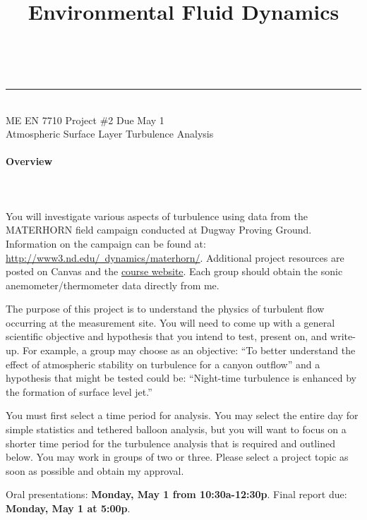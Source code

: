 \documentclass[11pt]{article}
\makeatletter
\newcommand{\linia}{\rule{\linewidth}{0.5pt}}
\renewcommand{\maketitle}{
\begin{center}
\vspace{2ex}
{\huge \textsc{\@title}}
\vspace{1ex}
\\
\linia\\
ME EN 7710 \hfill Project \#2 \hfill Due May 1\\
Atmospheric Surface Layer Turbulence Analysis
\vspace{4ex}
\end{center}
}
\makeatother
\begin{document}

\title{Environmental Fluid Dynamics}

\maketitle
\vspace{-20pt}
\paragraph{\large Overview}~\\~\\
You will investigate various aspects of turbulence using data from the MATERHORN field campaign conducted at Dugway Proving Ground. Information on the campaign can be found at: \href{http://www3.nd.edu/~dynamics/materhorn/}{http://www3.nd.edu/~dynamics/materhorn/}. Additional project resources are posted on Canvas and the \href{http://gibbs.science/efd}{course website}. Each group should obtain the sonic anemometer/thermometer data directly from me.

 The purpose of this project is to understand the physics of turbulent flow occurring at the measurement site. You will need to come up with a general scientific objective and hypothesis that you intend to test, present on, and write-up. For example, a group may choose as an objective: ``To better understand the effect of atmospheric stability on turbulence for a canyon outflow'' and a hypothesis that might be tested could be: ``Night-time turbulence is enhanced by the formation of surface level jet.''

You must first select a time period for analysis. You may select the entire day for simple statistics and tethered balloon analysis, but you will want to focus on a shorter time period for the turbulence analysis that is required and outlined below. You may work in groups of two or three. Please select a project topic as soon as possible and obtain my approval. 

Oral presentations: \textbf{Monday, May 1 from 10:30a-12:30p}. Final report due: \textbf{Monday, May 1 at 5:00p}.
\end{document}
